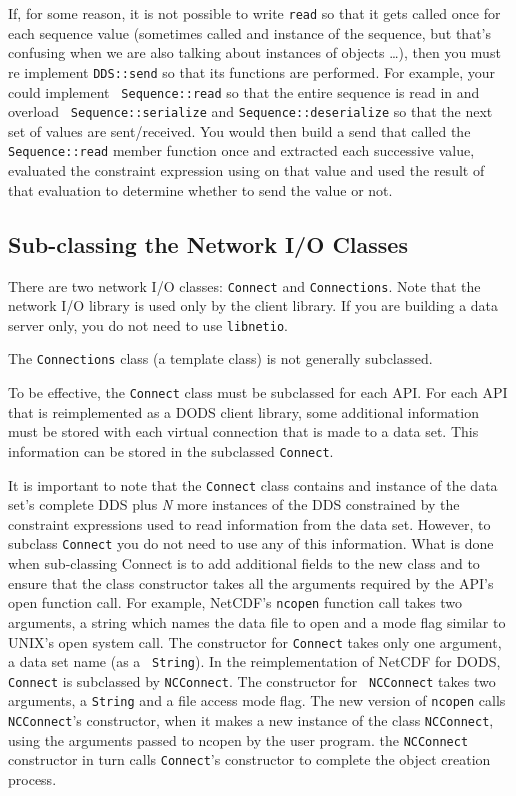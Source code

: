 If, for some reason, it is not possible to write {\tt read} so that it gets
called once for each sequence value (sometimes called and instance of the
sequence, but that's confusing when we are also talking about instances of
objects \ldots), then you must re implement {\tt DDS::send} so that its
functions are performed. For example, your could implement {\tt
  Sequence::read} so that the entire sequence is read in and overload {\tt
  Sequence::serialize} and {\tt Sequence::deserialize} so that the next set
of values are sent/received. You would then build a send that called the {\tt
  Sequence::read} member function once and extracted each successive value,
evaluated the constraint expression using on that value and used the result
of that evaluation to determine whether to send the value or not.

\subsection{Sub-classing the Network I/O Classes}
\label{tk:subclass-netio}

There are two network I/O classes: {\tt Connect} and {\tt Connections}. Note
that the network I/O library is used only by the client library. If you are
building a data server only, you do not need to use {\tt libnetio}.

The {\tt Connections} class (a template class) is not generally subclassed.

To be effective, the {\tt Connect} class must be subclassed for each API. For
each API that is reimplemented as a DODS client library, some additional
information must be stored with each virtual connection that is made to a
data set. This information can be stored in the subclassed {\tt Connect}.

It is important to note that the {\tt Connect} class contains and instance of
the data set's complete DDS plus {\em N\/} more instances of the DDS
constrained by the constraint expressions used to read information from the
data set. However, to subclass {\tt Connect} you do not need to use any of
this information. What is done when sub-classing Connect is to add additional
fields to the new class and to ensure that the class constructor takes all
the arguments required by the API's open function call. For example, NetCDF's
{\tt ncopen} function call takes two arguments, a string which names the data
file to open and a mode flag similar to UNIX's open system call. The
constructor for {\tt Connect} takes only one argument, a data set name (as a
\Cpp\ {\tt String}). In the reimplementation of NetCDF for DODS, {\tt
  Connect} is subclassed by {\tt NCConnect}. The constructor for {\tt
  NCConnect} takes two arguments, a {\tt String} and a file access mode flag.
The new version of {\tt ncopen} calls {\tt NCConnect}'s constructor, when it
makes a new instance of the class {\tt NCConnect}, using the arguments passed
to ncopen by the user program. the {\tt NCConnect} constructor in turn calls
{\tt Connect}'s constructor to complete the object creation process.

